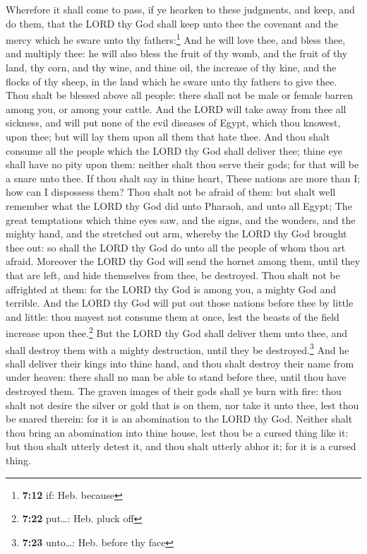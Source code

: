  Wherefore it shall come to pass, if ye hearken to these
judgments, and keep, and do them, that the LORD thy God shall keep unto
thee the covenant and the mercy which he sware unto thy
fathers:\footnote{\textbf{7:12} if: Heb. because}  And he
will love thee, and bless thee, and multiply thee: he will also bless
the fruit of thy womb, and the fruit of thy land, thy corn, and thy
wine, and thine oil, the increase of thy kine, and the flocks of thy
sheep, in the land which he sware unto thy fathers to give thee.
 Thou shalt be blessed above all people: there shall not
be male or female barren among you, or among your cattle.
 And the LORD will take away from thee all sickness, and
will put none of the evil diseases of Egypt, which thou knowest, upon
thee; but will lay them upon all them that hate thee. 
And thou shalt consume all the people which the LORD thy God shall
deliver thee; thine eye shall have no pity upon them: neither shalt thou
serve their gods; for that will be a snare unto thee.  If
thou shalt say in thine heart, These nations are more than I; how can I
dispossess them?  Thou shalt not be afraid of them: but
shalt well remember what the LORD thy God did unto Pharaoh, and unto all
Egypt;  The great temptations which thine eyes saw, and
the signs, and the wonders, and the mighty hand, and the stretched out
arm, whereby the LORD thy God brought thee out: so shall the LORD thy
God do unto all the people of whom thou art afraid. 
Moreover the LORD thy God will send the hornet among them, until they
that are left, and hide themselves from thee, be destroyed.
 Thou shalt not be affrighted at them: for the LORD thy
God is among you, a mighty God and terrible.  And the
LORD thy God will put out those nations before thee by little and
little: thou mayest not consume them at once, lest the beasts of the
field increase upon thee.\footnote{\textbf{7:22} put\ldots: Heb. pluck
  off}  But the LORD thy God shall deliver them unto
thee, and shall destroy them with a mighty destruction, until they be
destroyed.\footnote{\textbf{7:23} unto\ldots: Heb. before thy face}
 And he shall deliver their kings into thine hand, and
thou shalt destroy their name from under heaven: there shall no man be
able to stand before thee, until thou have destroyed them.
 The graven images of their gods shall ye burn with fire:
thou shalt not desire the silver or gold that is on them, nor take it
unto thee, lest thou be snared therein: for it is an abomination to the
LORD thy God.  Neither shalt thou bring an abomination
into thine house, lest thou be a cursed thing like it: but thou shalt
utterly detest it, and thou shalt utterly abhor it; for it is a cursed
thing.

